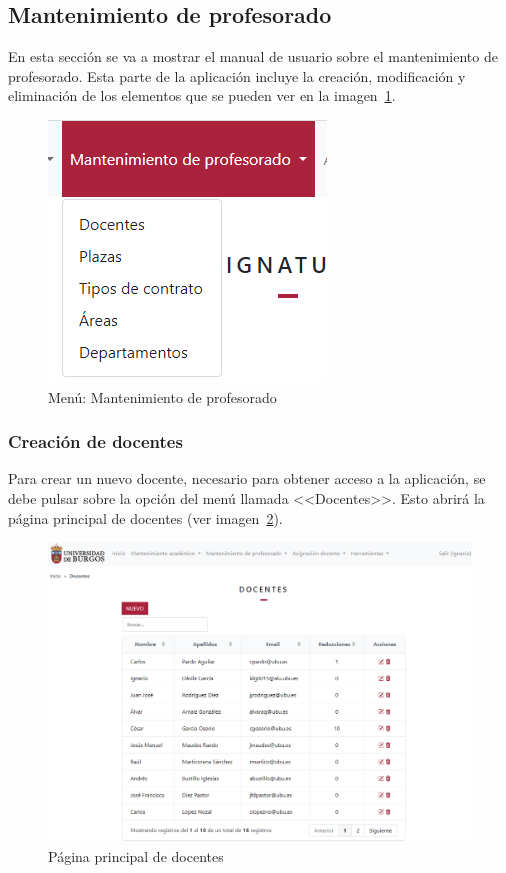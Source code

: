 \subsection{Mantenimiento de profesorado}
En esta sección se va a mostrar el manual de usuario sobre el mantenimiento de profesorado.
Esta parte de la aplicación incluye la creación, modificación y eliminación de los elementos que se pueden ver en la imagen~\ref{pag:menuManProf}.

\begin{figure}
	\centering
	\includegraphics[width=.5\textwidth]{../img/Anexos/Manual usuario/menu man prof.png}
	\caption{Menú: Mantenimiento de profesorado}\label{pag:menuManProf}
\end{figure}

\subsubsection{Creación de docentes}
Para crear un nuevo docente, necesario para obtener acceso a la aplicación, se debe pulsar sobre la opción del menú llamada <<Docentes>>.
Esto abrirá la página principal de docentes (ver imagen~\ref{pag:docentes}).

\begin{figure}
	\centering
	\includegraphics[width=\textwidth]{../img/Anexos/Manual usuario/docentes.png}
	\caption{Página principal de docentes}\label{pag:docentes}
\end{figure}

